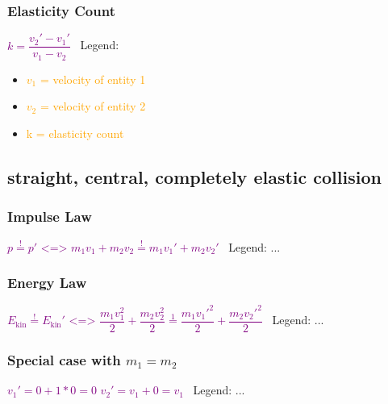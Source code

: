 \documentclass[main.tex,fontsize=8pt,paper=a4,paper=portrait,DIV=calc,]{scrartcl}
\begin{document}
\begin{multicols*}{2}
\subsubsection{Elasticity Count}
\vspace{2mm}
\large \textcolor{purple}{\( k = \dfrac{v_2' - v_1'}{v_1 - v_2} \)}\newline
\normalsize \, \newline
Legend:\newline
\begin{itemize}
\item \textcolor{orange}{\(v_1\) = velocity of entity 1}
\item \textcolor{orange}{\(v_2\) = velocity of entity 2}
\item \textcolor{orange}{k = elasticity count}
\end{itemize} 


\subsection{straight, central, completely elastic collision}

\subsubsection{Impulse Law}
\vspace{2mm}
\large \textcolor{purple}{\( p \overset{!}{=} p' \text{ <=> } m_1v_1 + m_2v_2 \overset{!}{=} m_1v_1' + m_2v_2' \)}\newline
\normalsize \, \newline
Legend:\newline
...

\subsubsection{Energy Law}
\vspace{2mm}
\large \textcolor{purple}{\( E_{\text{kin}} \overset{!}{=} E_{\text{kin}}' \text{ <=> } \dfrac{m_1v_1^2}{2} + \dfrac{m_2v_2^2}{2} \overset{1}{=} \dfrac{m_1v_1'^2}{2} + \dfrac{m_2v_2'^2}{2} \)}\newline
\normalsize \, \newline
Legend:\newline
...

\subsubsection{Special case with \(m_1 = m_2\)}
\vspace{2mm}
\large \textcolor{purple}{\( v_1' = 0 + 1 * 0 = 0 \)}\newline
\textcolor{purple}{\( v_2' = v_1 + 0 = v_1\)}\newline
\normalsize \, \newline
Legend: \newline
...



\end{multicols*}
\end{document}

